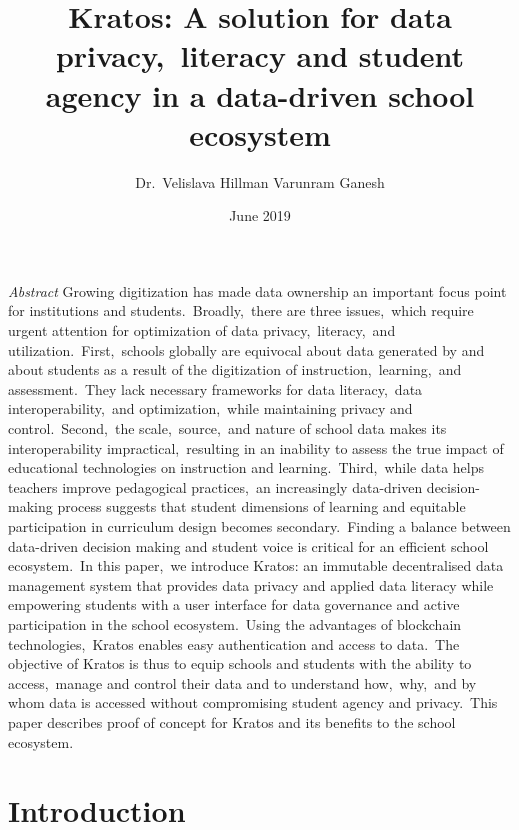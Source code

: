 \documentclass{article}
\title{Kratos: A solution for data privacy,\ literacy and student agency in a data-driven school ecosystem}
\author{Dr.\ Velislava Hillman \quad Varunram Ganesh}
\date{June 2019}
\begin{document}
\maketitle

\textit{Abstract}
Growing digitization has made data ownership an important focus point for institutions and students.\ Broadly,\ there are three issues,\ which require urgent attention for optimization of data privacy,\ literacy,\ and utilization.\ First,\ schools globally are equivocal about data generated by and about students as a result of the digitization of instruction,\ learning,\ and assessment.\ They lack necessary frameworks for data literacy,\ data interoperability,\ and optimization,\ while maintaining privacy and control.\ Second,\ the scale,\ source,\ and nature of school data makes its interoperability impractical,\ resulting in an inability to assess the true impact of educational technologies on instruction and learning.\ Third,\ while data helps teachers improve pedagogical practices,\ an increasingly data-driven decision-making process suggests that student dimensions of learning and equitable participation in curriculum design becomes secondary.\ Finding a balance between data-driven decision making and student voice is critical for an efficient school ecosystem.\ In this paper,\ we introduce Kratos: an immutable decentralised data management system that provides data privacy and applied data literacy while empowering students with a user interface for data governance and active participation in the school ecosystem.\ Using the advantages of blockchain technologies,\ Kratos enables easy authentication and access to data.\ The objective of Kratos is thus to equip schools and students with the ability to access,\ manage and control their data and to understand how,\ why,\ and by whom data is accessed without compromising student agency and privacy.\ This paper describes proof of concept for Kratos and its benefits to the school ecosystem.
\bigbreak
\newpage
\section{Introduction}
\end{document}
